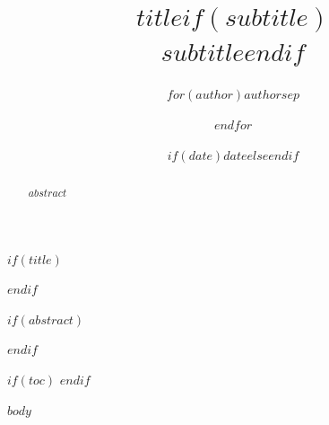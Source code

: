 \documentclass[12pt, letterpaper, parskip=half]{scrartcl}
\title{$title$$if(subtitle)$\\\medskip\large\normalfont $subtitle$$endif$}
\author{$for(author)$$author$$sep$ \and $endfor$}
\date{$if(date)$$date$$else$$endif$}
\begin{document}
$if(title)$
\maketitle
\thispagestyle{plain}
$endif$

$if(abstract)$
\begin{abstract}
\noindent $abstract$
\end{abstract}
\vspace{1em}
$endif$

$if(toc)$
\tableofcontents
\newpage
$endif$

$body$
\end{document}
